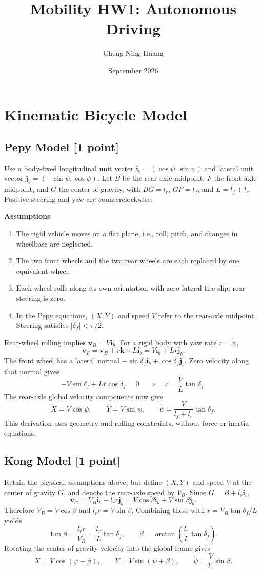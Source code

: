 \documentclass{article}
\title{Mobility HW1: Autonomous Driving}
\author{Cheng-Ning Huang}
\date{September 2026}
\begin{document}
\maketitle

\section{Kinematic Bicycle Model}\label{sec:vehicleControl}
\subsection{Pepy Model [1 point]}
Use a body-fixed longitudinal unit vector $\mathbf i_b=(\cos\psi,\sin\psi)$ and lateral unit vector $\mathbf j_b=(-\sin\psi,\cos\psi)$. Let $B$ be the rear-axle midpoint, $F$ the front-axle midpoint, and $G$ the center of gravity, with $BG=l_r$, $GF=l_f$, and $L=l_f+l_r$. Positive steering and yaw are counterclockwise.

\textbf{Assumptions}
\begin{enumerate}
\renewcommand{\labelenumi}{(\arabic{enumi})}
\item The rigid vehicle moves on a flat plane, i.e., roll, pitch, and changes in wheelbase are neglected.
\item The two front wheels and the two rear wheels are each replaced by one equivalent wheel.
\item Each wheel rolls along its own orientation with zero lateral tire slip; rear steering is zero.
\item In the Pepy equations, $(X,Y)$ and speed $V$ refer to the rear-axle midpoint. Steering satisfies $|\delta_f|<\pi/2$.
\end{enumerate}

Rear-wheel rolling implies $\mathbf v_B=V\mathbf i_b$. For a rigid body with yaw rate $r=\dot\psi$,
\[
\mathbf v_F=\mathbf v_B+r\mathbf k\times L\mathbf i_b
           =V\mathbf i_b+Lr\mathbf j_b.
\]
The front wheel has a lateral normal $-\sin\delta_f\mathbf i_b+\cos\delta_f\mathbf j_b$. Zero velocity along that normal gives
\[
-V\sin\delta_f+Lr\cos\delta_f=0
\quad\Rightarrow\quad r=\frac{V}{L}\tan\delta_f.
\]
The rear-axle global velocity components now give
\[
\boxed{\dot X=V\cos\psi,\qquad \dot Y=V\sin\psi,\qquad
\dot\psi=\frac{V}{l_f+l_r}\tan\delta_f.}
\]
This derivation uses geometry and rolling constraints, without force or inertia equations.

\subsection{Kong Model [1 point]}
Retain the physical assumptions above, but define $(X,Y)$ and speed $V$ at the center of gravity $G$, and denote the rear-axle speed by $V_B$. Since $G=B+l_r\mathbf i_b$,
\[
\mathbf v_G=V_B\mathbf i_b+l_rr\mathbf j_b
=V\cos\beta\mathbf i_b+V\sin\beta\mathbf j_b.
\]
Therefore $V_B=V\cos\beta$ and $l_rr=V\sin\beta$. Combining these with $r=V_B\tan\delta_f/L$ yields
\[
\tan\beta=\frac{l_rr}{V_B}=\frac{l_r}{L}\tan\delta_f,
\qquad \beta=\arctan\left(\frac{l_r}{L}\tan\delta_f\right).
\]
Rotating the center-of-gravity velocity into the global frame gives
\[
\boxed{\dot X=V\cos(\psi+\beta),\qquad
\dot Y=V\sin(\psi+\beta),\qquad
\dot\psi=\frac{V}{l_r}\sin\beta.}
\]
\end{document}
